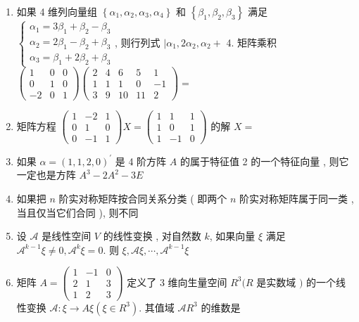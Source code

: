 \documentclass[10pt]{article}
\begin{document}
{\begin{enumerate}
  \item  如果  4  维列向量组  $\left\{\alpha_{1}, \alpha_{2}, \alpha_{3}, \alpha_{4}\right\}$  和  $\left\{\beta_{1}, \beta_{2}, \beta_{3}\right\}$  满足  $\left\{\begin{array}{c}\alpha_{1}=3 \beta_{1}+\beta_{2}-\beta_{3} \\ \alpha_{2}=2 \beta_{1}-\beta_{2}+\beta_{3} \\ \alpha_{3}=\beta_{1}+2 \beta_{2}+\beta_{3}\end{array}\right.$,  则行列式  $\mid \alpha_{1}, 2 \alpha_{2}, \alpha_{2}+$ 4.  矩阵乘积  $\left(\begin{array}{ccc}1 & 0 & 0 \\ 0 & 1 & 0 \\ -2 & 0 & 1\end{array}\right)\left(\begin{array}{ccccc}2 & 4 & 6 & 5 & 1 \\ 1 & 1 & 1 & 0 & -1 \\ 3 & 9 & 10 & 11 & 2\end{array}\right)=$

  \item  矩阵方程  $\left(\begin{array}{ccc}1 & -2 & 1 \\ 0 & 1 & 0 \\ 0 & -1 & 1\end{array}\right) X=\left(\begin{array}{ccc}1 & 1 & 1 \\ 1 & 0 & 1 \\ 1 & -1 & 0\end{array}\right)$  的解  $X=$

  \item  如果  $\alpha=(1,1,2,0)^{\prime}$  是  4  阶方阵  $A$  的属于特征值  2  的一个特征向量 ,  则它一定也是方阵  $A^{3}-2 A^{2}-3 E$

  \item  如果把  $n$  阶实对称矩阵按合同关系分类 ( 即两个  $n$  阶实对称矩阵属于同一类 ,  当且仅当它们合同 ),  则不同 

  \item  设  $\mathscr{A}$  是线性空间  $V$  的线性变换 ,  对自然数  $k$,  如果向量  $\xi$  满足  $\mathscr{A}^{k-1} \xi \neq 0, \mathscr{A}^{k} \xi=0$.  则  $\xi, \mathscr{A} \xi, \cdots, \mathscr{A}^{k-1} \xi$

  \item  矩阵  $A=\left(\begin{array}{ccc}1 & -1 & 0 \\ 2 & 1 & 3 \\ 1 & 2 & 3\end{array}\right)$  定义了  3  维向生量空间  $R^{3}(R$  是实数域  $)$  的一个线性变换  $\mathscr{A}: \xi \rightarrow A \xi\left(\xi \in R^{3}\right)$.  其值域  $\mathscr{A} R^{3}$  的维数是 


\end{enumerate}}
\end{document}
